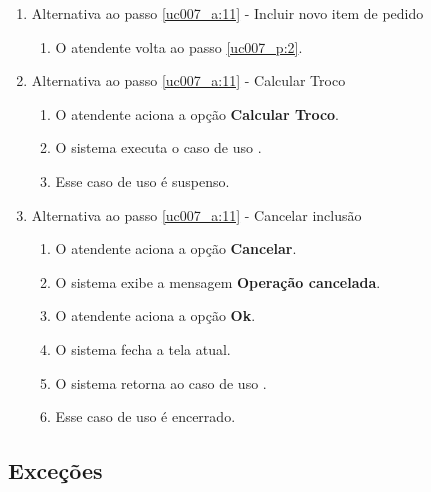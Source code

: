 \begin{enumerate}[label=A\arabic*]
	\item Alternativa ao passo \ref{uc007_a:11} - Incluir novo item de pedido \label{uc007_a:1}
	\begin{enumerate}[label*=.\arabic*]
		\item O atendente volta ao passo \ref{uc007_p:2}.
	\end{enumerate}
	
	\item Alternativa ao passo \ref{uc007_a:11} - Calcular Troco \label{uc007_a:2}
	\begin{enumerate}[label*=.\arabic*]
		\item O atendente aciona a opção \textbf{Calcular Troco}.
		\item O sistema executa o caso de uso .
		\item Esse caso de uso é suspenso.
	\end{enumerate} 
		
	\item Alternativa ao passo \ref{uc007_a:11} - Cancelar inclusão \label{uc007_a:3}
	\begin{enumerate}[label*=.\arabic*]
		\item O atendente aciona a opção \textbf{Cancelar}.
		\item O sistema exibe a mensagem \textbf{Operação cancelada}.
		\item O atendente aciona a opção \textbf{Ok}.
		\item O sistema fecha a tela atual.
		\item O sistema retorna ao caso de uso .
		\item Esse caso de uso é encerrado.
	\end{enumerate} 	
\end{enumerate}

\subsection{Exceções}

